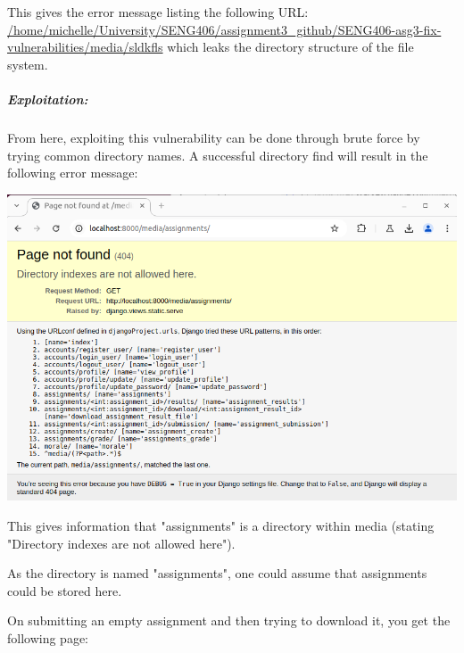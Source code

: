 This gives the error message listing the following URL: \url{/home/michelle/University/SENG406/assignment3_github/SENG406-asg3-fix-vulnerabilities/media/sldkfls} which leaks the directory structure of the file system.

\subparagraph{Exploitation:}

From here, exploiting this vulnerability can be done through brute force by trying common directory names. A successful directory find will result in the following error message:

\begin{center}
    \includegraphics[width = \linewidth]{images/Michelle/directoryindex.png}
\end{center}

This gives information that "assignments" is a directory within media (stating "Directory indexes are not allowed here").

As the directory is named "assignments", one could assume that assignments could be stored here.

On submitting an empty assignment and then trying to download it, you get the following page:

